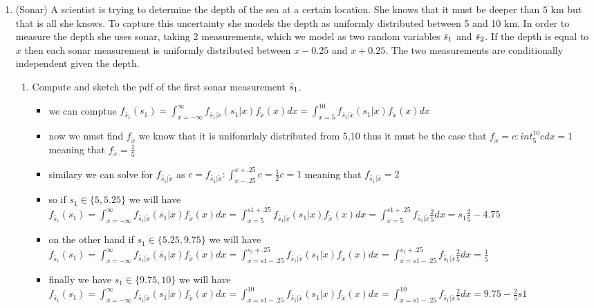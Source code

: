 \documentclass[12pt,twoside]{article}
\begin{document}
\begin{enumerate}
\item (Sonar)
A scientist is trying to determine the depth of the sea at a certain location. She knows that it must be deeper than $5$ km but that is all she knows. To capture this uncertainty she models the depth as uniformly distributed between 5 and 10 km. In order to measure the depth she uses sonar, taking 2 measurements, which we model as two random variables $\tilde{  s }_1$ and $\tilde{  s }_2$. If the depth is equal to $x$ then each sonar measurement is uniformly distributed between $x-0.25$ and $x+0.25$. The two measurements are conditionally independent given the depth. 
\begin{enumerate}
\item Compute and sketch the pdf of the first sonar measurement $\tilde{  s }_1$. 
\begin{itemize}
    \item we can comptue $f_{\tilde{s_1}}(s_1)=\int_{x=-\infty}^{\infty}f_{\tilde{s_1}|\tilde{x}}(s_1|x)f_{\tilde{x}}(x)dx=\int_{x=5}^{10}f_{\tilde{s_1}|\tilde{x}}(s_1|x)f_{\tilde{x}}(x)dx$
    \item now we must find $f_{\tilde{x}}$ we know that it is unifomrlaly distributed from 5,10 thus it must be the case that $f_{\tilde{x}}=c: int_{5}^{10}cdx=1$ meaning that $f_{\tilde{x}}=\frac{1}{5}$
    \item similary we can solve for $f_{\tilde{s_1}|\tilde{x}}$ as $c=f_{\tilde{s_1}|\tilde{x}}:\int_{x-.25}^{x+.25}c=\frac{1}{2}c=1$ meaning that $f_{\tilde{s_1}|\tilde{x}}=2$
    \item so if $s_1\in\{5,5.25\}$ we will have $f_{\tilde{s_1}}(s_1)=\int_{x=-\infty}^{\infty}f_{\tilde{s_1}|\tilde{x}}(s_1|x)f_{\tilde{x}}(x)dx=\int_{x=5}^{s1+.25}f_{\tilde{s_1}|\tilde{x}}(s_1|x)f_{\tilde{x}}(x)dx=\int_{x=5}^{s1+.25}f_{\tilde{s_1}|\tilde{x}}\frac{2}{5}dx=s_1\frac{2}{5}-4.75$
    \item on the other hand if $s_1\in\{5.25,9.75\}$ we will have $f_{\tilde{s_1}}(s_1)=\int_{x=-\infty}^{\infty}f_{\tilde{s_1}|\tilde{x}}(s_1|x)f_{\tilde{x}}(x)dx=\int_{x=s1-.25}^{s_1+.25}f_{\tilde{s_1}|\tilde{x}}(s_1|x)f_{\tilde{x}}(x)dx=\int_{x=s1-.25}^{s_1+.25}f_{\tilde{s_1}|\tilde{x}}\frac{2}{5}dx=\frac{1}{5}$
    \item finally we have $s_1\in\{9.75,10\}$ we will have $f_{\tilde{s_1}}(s_1)=\int_{x=-\infty}^{\infty}f_{\tilde{s_1}|\tilde{x}}(s_1|x)f_{\tilde{x}}(x)dx=\int_{x=s1-.25}^{10}f_{\tilde{s_1}|\tilde{x}}(s_1|x)f_{\tilde{x}}(x)dx=\int_{x=s1-.25}^{10}f_{\tilde{s_1}|\tilde{x}}\frac{2}{5}dx=9.75-\frac{2}{5}s1$

\end{itemize}
\end{enumerate}
\end{enumerate}
\end{document}
